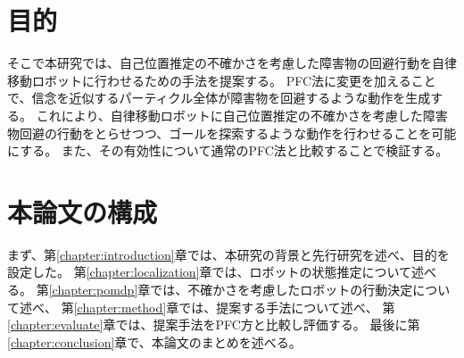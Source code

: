 \section{目的}
そこで本研究では、自己位置推定の不確かさを考慮した障害物の回避行動を自律移動ロボットに行わせるための手法を提案する。
PFC法に変更を加えることで、信念を近似するパーティクル全体が障害物を回避するような動作を生成する。
これにより、自律移動ロボットに自己位置推定の不確かさを考慮した障害物回避の行動をとらせつつ、ゴールを探索するような動作を行わせることを可能にする。
また、その有効性について通常のPFC法と比較することで検証する。


\section{本論文の構成}
まず、第\ref{chapter:introduction}章では、本研究の背景と先行研究を述べ、目的を設定した。
第\ref{chapter:localization}章では、ロボットの状態推定について述べる。
第\ref{chapter:pomdp}章では、不確かさを考慮したロボットの行動決定について述べ、
第\ref{chapter:method}章では、提案する手法について述べ、
第\ref{chapter:evaluate}章では、提案手法をPFC方と比較し評価する。
最後に第\ref{chapter:conclusion}章で、本論文のまとめを述べる。


